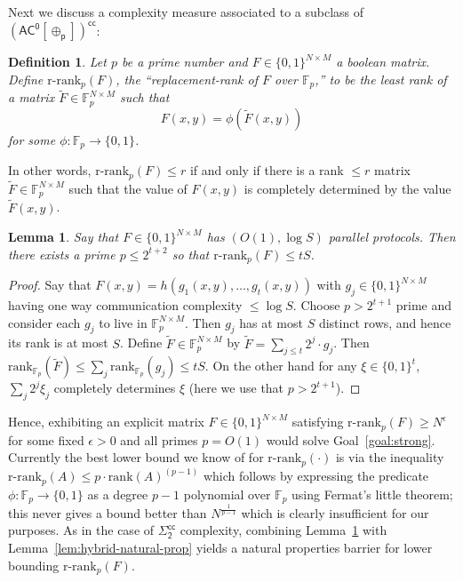 \documentclass[11pt]{article}
\newtheorem{lemma}{Lemma}
\newtheorem{definition}{Definition}
\newcommand{\dash}{\text{-}}
\newcommand{\B}{\{0,1\}}
\newcommand{\rank}{\mathrm{rank}}
\newcommand{\rrank}{\mathrm{r}\dash\mathrm{rank}}
\begin{document}
Next we discuss a complexity measure associated to a subclass of $\mathsf{(AC^0[\oplus_p])^{cc}}$:
\begin{definition}
Let $p$ be a prime number and $F \in \B^{N \times M}$ a boolean matrix. Define $\rrank_{p}(F)$, the ``replacement-rank of $F$ over $\mathbb{F}_p$,'' to be the least rank of a matrix $\tilde{F} \in \mathbb{F}_p^{N \times M}$ such that
\[
F(x,y) = \phi(\tilde{F}(x,y))
\]
for some $\phi: \mathbb{F}_p \to \B$. 
\end{definition}
In other words, $\rrank_{p}(F)\leq r$ if and only if there is a rank $\leq r$ matrix $\tilde{F} \in \mathbb{F}_p^{N \times M}$ such that the value of $F(x,y)$ is completely determined by the value $\tilde{F}(x,y)$.
\begin{lemma}\label{lem:replacement-rank}
Say that $F \in \B^{N \times M}$ has $(O(1), \log S)$ parallel protocols. Then there exists a prime $p \leq 2^{t+2}$ so that $\rrank_p(F) \leq tS$. 
\end{lemma}
\begin{proof}
Say that $F(x,y) = h(g_1(x,y),\ldots,g_t(x,y))$ with $g_j\in \B^{N \times M}$ having one way communication complexity $\leq \log S$. Choose $p > 2^{t+1}$ prime and consider each $g_j$ to live in $\mathbb{F}_p^{N \times M}$. Then $g_j$ has at most $S$ distinct rows, and hence its rank is at most $S$. Define $\tilde{F} \in \mathbb{F}_p^{N \times M}$ by $\tilde{F} = \sum_{j \leq t} 2^j \cdot g_j$.
Then $\mathrm{rank}_{\mathbb{F}_p}(\tilde{F}) \leq \sum_j \mathrm{rank}_{\mathbb{F}_p}(g_j) \leq tS$. On the other hand for any $\xi \in \B^t$, $\sum_j 2^j \xi_j$ completely determines $\xi$ (here we use that $p > 2^{t+1}$).
\end{proof}
Hence, exhibiting an explicit matrix $F \in \B^{N \times M}$ satisfying $\rrank_p(F) \geq N^{\epsilon}$ for some fixed $\epsilon>0$ and all primes $p =O(1)$ would solve Goal~\ref{goal:strong}. Currently the best lower bound we know of for $\rrank_p(\cdot)$ is via the inequality $\rrank_p(A) \leq p\cdot \rank(A)^{(p-1)}$ which follows by expressing the predicate $\phi: \mathbb{F}_p \to \B$ as a degree $p-1$ polynomial over $\mathbb{F}_p$ using Fermat's little theorem; this never gives a bound better than $N^{\frac{1}{p-1}}$ which is clearly insufficient for our purposes. 
As in the case of $\mathsf{\Sigma_2^{cc}}$ complexity, combining Lemma~\ref{lem:replacement-rank} with Lemma~\ref{lem:hybrid-natural-prop} yields a natural properties barrier for lower bounding $\rrank_p(F)$.
\end{document}
